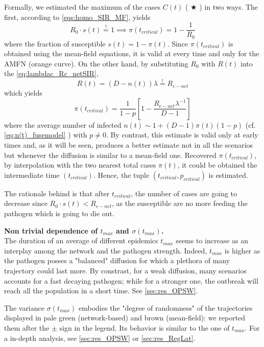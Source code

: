 \documentclass[a4paper,10pt,twoside]{book} %
\theoremstyle{definition}
\begin{document}
Formally, we estimated the maximum of the cases $ C(t)$ ( $ \bigstar$ ) in two ways.
The first, according to \autoref{eqs:homo_SIR_MF}, yields 
\begin{equation}
	R_0 \cdot s(t) \stackrel{!}{=} 1 \implies \pi(t_{critical}) = 1 - \frac{1}{R_0}
	\label{eq:picrit_AMFN}
\end{equation}
where the fraction of susceptible $ s(t) = 1- \pi(t)$.  
Since $ \pi(t_{critical})$ is obtained using the mean-field equations, it is valid at every time and only for the AMFN (orange curve).
On the other hand, by substituting $ R_0$ with $ R(t)$ into the \autoref{eq:lambdac_Rc_netSIR},
\begin{equation}
	R(t) = (D-n(t))\lambda \stackrel{!}{=} R_{c-net}
	\label{eq:RcRnet_network}
\end{equation}
which yields
\begin{equation}
	\pi(t_{critical}) = \frac{1}{1-p} \left[1- \frac{R_{c-net} \lambda^{-1}}{D-1} \right]
	\label{eq:picrit_network}
\end{equation}
where the average number of infected $n(t) \sim 1+(D-1)\pi(t)(1- p)$ (cf. \autoref{eq:n(t)_fusemodel} ) with $p \neq 0$.
By contrast, this estimate is valid only at early times and, as it will be seen, produces a better estimate not in all the scenarios but whenever the diffusion is similar to a mean-field one.
Recovered $ \pi(t_{critical})$, by interpolation with the two nearest total cases $ \pi(t)$, it could be obtained the intermediate time $(t_{critical})$. Hence, the tuple $(t_{critical},p_{critical})$ is estimated.

The rationale behind is that after $ t_{critical}$, the number of cases are going to decrease since $R_0 \cdot s(t) < R_{c-net}$, as the susceptible are no more feeding the pathogen which is going to die out.

\textbf{Non trivial dependence of $ t_{max}$ and $ \sigma(t_{max})$.} \\
The duration of an average of different epidemics $t_{max}$ seems to increase as an interplay among the network and the pathogen strength. Indeed, $ t_{max}$ is higher as the pathogen posses a "balanced" diffusion for which a plethora of many trajectory could last more. By constrast, for a weak diffusion, many scenarios accounts for a fast decaying pathogen; while for a stronger one, the outbreak will reach all the population in a short time. See \autoref{sec:res_OPSW}. 

The variance $\sigma(t_{max})$ embodies the "degree of randomness" of the trajectories displayed in pale green (network-based) and brown (mean-field): we reported them after the $\pm$ sign in the legend. Its behavior is similar to the one of $t_{max}$. For a in-depth analysis, see \autoref{sec:res_OPSW} or \autoref{sec:res_RegLat}.
\end{document}
